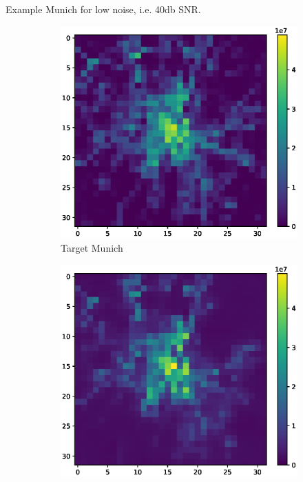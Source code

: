 Example Munich for low noise, i.e. 40db SNR.
\begin{figure}
    \centering
    \begin{subfigure}[b]{0.32\textwidth}
        \includegraphics[width=\textwidth]{figures/06_results/gaussian_plume_example/munich/target.eps}
        \caption{Target Munich}
    \end{subfigure}
    \begin{subfigure}[b]{0.32\textwidth}
        \includegraphics[width=\textwidth]{figures/06_results/gaussian_plume_example/munich/gen_2048_fine_tuned_40_db.eps}

\end{subfigure}
\end{figure}
